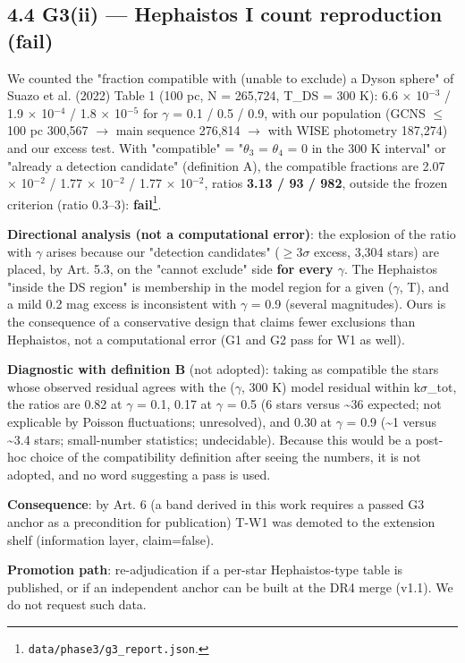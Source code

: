 \documentclass[11pt]{article}
\begin{document}
\subsection*{4.4 G3(ii) --- Hephaistos I count reproduction (fail)}
\noindent We counted the "fraction compatible with (unable to exclude) a Dyson sphere" of Suazo et al. (2022) Table 1 (100 pc, N = 265,724, T\_DS = 300 K): 6.6 \(\times\) 10\(^{-3}\) / 1.9 \(\times\) 10\(^{-4}\) / 1.8 \(\times\) 10\(^{-5}\) for \(\gamma\) = 0.1 / 0.5 / 0.9, with our population (GCNS \(\leq\)100 pc 300,567 \(\rightarrow\) main sequence 276,814 \(\rightarrow\) with WISE photometry 187,274) and our excess test. With "compatible" = "\(\theta\)\(_{3}\) = \(\theta\)\(_{4}\) = 0 in the 300 K interval" or "already a detection candidate" (definition A), the compatible fractions are 2.07 \(\times\) 10\(^{-2}\) / 1.77 \(\times\) 10\(^{-2}\) / 1.77 \(\times\) 10\(^{-2}\), ratios \textbf{3.13 / 93 / 982}, outside the frozen criterion (ratio 0.3--3): \textbf{fail}\footnote{\texttt{data/phase3/g3\_report.json}.}.\par\smallskip
\noindent \textbf{Directional analysis (not a computational error)}: the explosion of the ratio with \(\gamma\) arises because our "detection candidates" (\(\geq\)3\(\sigma\) excess, 3,304 stars) are placed, by Art. 5.3, on the "cannot exclude" side \textbf{for every \(\gamma\)}. The Hephaistos "inside the DS region" is membership in the model region for a given (\(\gamma\), T), and a mild 0.2 mag excess is inconsistent with \(\gamma\) = 0.9 (several magnitudes). Ours is the consequence of a conservative design that claims fewer exclusions than Hephaistos, not a computational error (G1 and G2 pass for W1 as well).\par\smallskip
\noindent \textbf{Diagnostic with definition B} (not adopted): taking as compatible the stars whose observed residual agrees with the (\(\gamma\), 300 K) model residual within k\(\sigma\)\_tot, the ratios are 0.82 at \(\gamma\) = 0.1, 0.17 at \(\gamma\) = 0.5 (6 stars versus \textasciitilde{}36 expected; not explicable by Poisson fluctuations; unresolved), and 0.30 at \(\gamma\) = 0.9 (\textasciitilde{}1 versus \textasciitilde{}3.4 stars; small-number statistics; undecidable). Because this would be a post-hoc choice of the compatibility definition after seeing the numbers, it is not adopted, and no word suggesting a pass is used.\par\smallskip
\noindent \textbf{Consequence}: by Art. 6 (a band derived in this work requires a passed G3 anchor as a precondition for publication) T-W1 was demoted to the extension shelf (information layer, claim=false).\par\smallskip
\noindent \textbf{Promotion path}: re-adjudication if a per-star Hephaistos-type table is published, or if an independent anchor can be built at the DR4 merge (v1.1). We do not request such data.\par\smallskip
\end{document}
